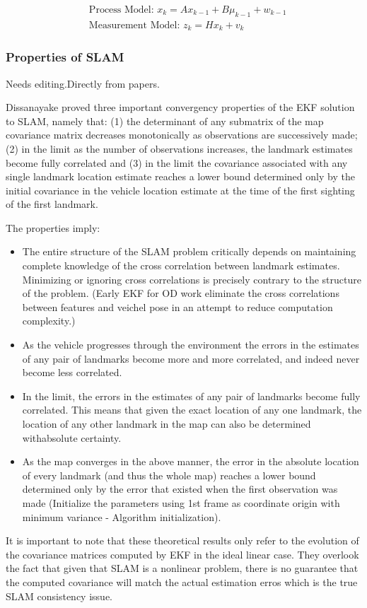 \begin{align}
&\text{Process Model: }x_k = Ax_{k-1}+B\mu_{k-1}+w_{k-1}\\
&\text{Measurement Model: }z_k = Hx_k+v_k
\end{align}



\subsubsection{Properties of SLAM}
\label{sec:SLAM_properties}

Needs editing.Directly from papers.

Dissanayake proved three important convergency properties of the EKF 
solution to SLAM, namely that: (1) the determinant of any submatrix of 
the map covariance matrix decreases monotonically as observations are 
successively made; (2) in the limit as the number of observations 
increases, the landmark estimates become fully correlated and (3) in the 
limit the covariance associated with any single landmark location 
estimate reaches a lower bound determined only by the initial covariance 
in the vehicle location estimate at the time of the first sighting of 
the first landmark.

The properties imply:

\begin{itemize}
  \item The entire structure of the SLAM problem critically depends on 
  maintaining complete knowledge of the cross correlation between landmark 
  estimates. Minimizing or ignoring cross correlations is precisely 
  contrary to the structure of the problem. (Early EKF for OD work 
  eliminate the cross correlations between features and veichel pose in an 
  attempt to reduce computation complexity.)
  \item As the vehicle progresses through the environment the errors in 
  the estimates of any pair of landmarks become more and more correlated, 
  and indeed never become less correlated.
  \item In the limit, the errors in the estimates of any pair of landmarks 
  become fully correlated. This means that given the exact location of any 
  one landmark, the location of any other landmark in the map can also be 
  determined withabsolute certainty.
  \item As the map converges in the above manner, the error in the 
  absolute location of every landmark (and thus the whole map) reaches a 
  lower bound determined only by the error that existed when the first 
  observation was made (Initialize the parameters using 1st frame as 
  coordinate origin with minimum variance - Algorithm initialization).
\end{itemize}
It is important to note that these theoretical results only refer to the 
evolution of the covariance matrices computed by EKF in the ideal linear 
case. They overlook the fact that given that SLAM is a nonlinear 
problem, there is no guarantee that the computed covariance will match 
the actual estimation erros which is the true SLAM consistency issue. 

